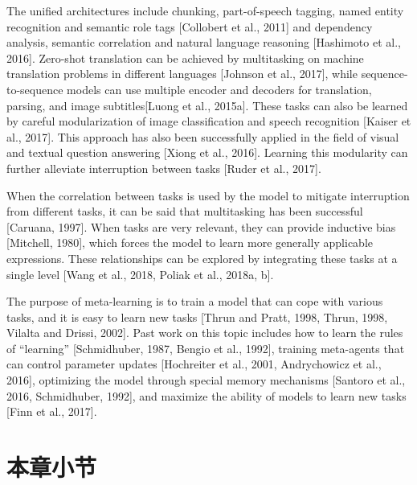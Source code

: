 The unified architectures include chunking, part-of-speech tagging, named entity recognition and semantic role tags [Collobert et al., 2011] and dependency analysis, semantic correlation and natural language reasoning [Hashimoto et al., 2016]. Zero-shot translation can be achieved by multitasking on machine translation problems in different languages [Johnson et al., 2017], while sequence-to-sequence models can use multiple encoder and decoders for translation, parsing, and image subtitles[Luong et al., 2015a]. These tasks can also be learned by careful modularization of image classification and speech recognition [Kaiser et al., 2017]. This approach has also been successfully applied in the field of visual and textual question answering [Xiong et al., 2016]. Learning this modularity can further alleviate interruption between tasks [Ruder et al., 2017].

When the correlation between tasks is used by the model to mitigate interruption from different tasks, it can be said that multitasking has been successful [Caruana, 1997]. When tasks are very relevant, they can provide inductive bias [Mitchell, 1980], which forces the model to learn more generally applicable expressions. These relationships can be explored by integrating these tasks at a single level [Wang et al., 2018, Poliak et al., 2018a, b].

The purpose of meta-learning is to train a model that can cope with various tasks, and it is easy to learn new tasks [Thrun and Pratt, 1998, Thrun, 1998, Vilalta and Drissi, 2002]. Past work on this topic includes how to learn the rules of “learning” [Schmidhuber, 1987, Bengio et al., 1992], training meta-agents that can control parameter updates [Hochreiter et al., 2001, Andrychowicz et al., 2016], optimizing the model through special memory mechanisms [Santoro et al., 2016, Schmidhuber, 1992], and maximize the ability of models to learn new tasks [Finn et al., 2017].
\section{本章小节}